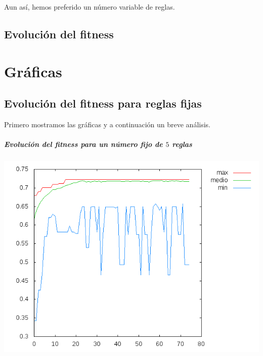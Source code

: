 \documentclass[nochap]{apuntes}
\begin{document}
Aun así, hemos preferido un número variable de reglas. 


\section{Evolución del fitness}



\appendix

\chapter{Gráficas}
\section{Evolución del fitness para reglas fijas}

Primero mostramos las gráficas y a continuación un breve análisis.
\paragraph{Evolución del fitness para un número fijo de $5$ reglas}
\begin{center}
\includegraphics[scale=0.5]{tex/img/g75_p75_MejoresPorPeores_SeleccionProporcionalAlFitness_reg5.png}
\end{center}
\end{document}
